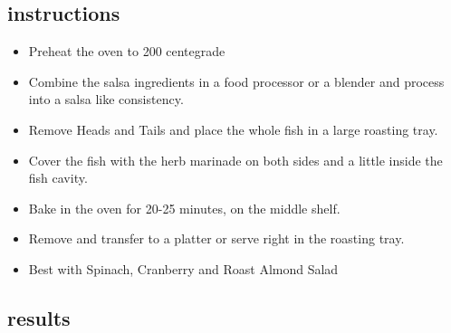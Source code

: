 \subsection*{instructions}

\begin{itemize}
	\item Preheat the oven to 200 centegrade
	\item Combine the salsa ingredients in a food processor or a blender and process into a salsa like consistency.
	\item Remove Heads and Tails and place the whole fish in a large roasting tray. 
	\item Cover the fish with the herb marinade on both sides and a little inside the fish cavity. 
	\item Bake in the oven for 20-25 minutes, on the middle shelf. 
	\item Remove and transfer to a platter or serve right in the roasting tray.
	\item Best with Spinach, Cranberry and Roast Almond Salad
\end{itemize}

\subsection*{results}
  
